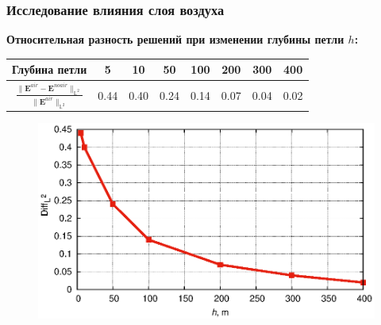 \documentclass[aspectratio=43]{beamer}
\newcommand{\MakeTitle}[1]{\frametitle{\hspace{1.5em}\textbf{#1} \hfill \insertframenumber{} }}
\begin{document}

\begin{frame}
	\MakeTitle{Исследование влияния слоя воздуха}
	\textbf{Относительная разность решений при изменении глубины петли $h$:}
	\begin{small}
	\begin{table}[ht]
		\begin{tabularx}{\textwidth}{|C{2.89}|C{0.73}|C{0.73}|C{0.73}|C{0.73}|C{0.73}|C{0.73}|C{0.73}|}
			\hline Глубина петли & 5 & 10 & 50 & 100 & 200 & 300 & 400 \\
			\hline $\displaystyle \frac{\| \mathbf{E}^{air} - \mathbf{E}^{noair} \|_{\mathbb{L}^2}}{\| \mathbf{E}^{air} \|_{\mathbb{L}^2}}$ & 0.44 & 0.40 & 0.24 & 0.14 & 0.07 & 0.04 & 0.02 \\
			\hline
		\end{tabularx}
	\end{table}
	\end{small}
	\vspace{-1em}
	\begin{figure}[ht]
		\includegraphics[scale=0.7]{presentation.eps}
	\label{fig:res1:graph}
	\end{figure}
\end{frame}

\end{document}
